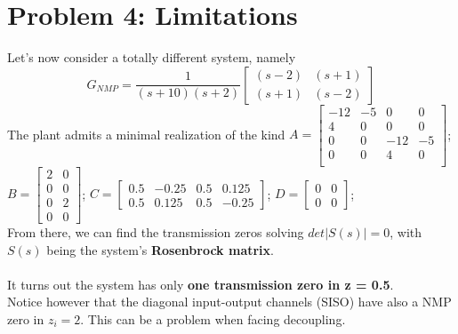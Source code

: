 \documentclass[a4paper, 12pt]{article}
\begin{document}
\section{Problem 4: Limitations}
Let's now consider a totally different system, namely
\begin{equation}
G_{NMP} = \frac{1}{(s+10)(s+2)}
\begin{bmatrix}
(s-2) & (s+1)\\
(s+1) & (s-2)
\end{bmatrix}
\end{equation}
The plant admits a minimal realization of the kind 
$A = \begin{bmatrix}
-12  &  -5  &   0  &   0 \\
 4   &  0   &  0   &  0 \\
 0   &  0   &-12   & -5 \\
 0   &  0   &  4   &  0 \\
\end{bmatrix}$;
$B = \begin{bmatrix}
2  &   0 \\
0  &   0 \\
0  &   2 \\
0  &   0 
\end{bmatrix}$;
$C = \begin{bmatrix}
0.5 &-0.25  & 0.5  & 0.125 \\
0.5 &  0.125 &  0.5 & -0.25
\end{bmatrix}$;
$D = \begin{bmatrix}
0 & 0 \\
0 & 0
\end{bmatrix}$;
\\ From there, we can find the transmission zeros solving $det|S(s)| = 0$, with $S(s)$ being the system's \textbf{Rosenbrock matrix}.
\\\\
It turns out the system has only \textbf{one transmission zero in z = 0.5}. 
\\ Notice however that the diagonal input-output channels (SISO) have also a NMP zero in $z_i = 2$. This can be a problem when facing decoupling.
\end{document}

